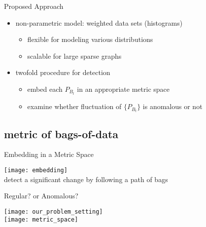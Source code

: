 \documentclass[fleqn,aspectratio=1610]{beamer}
\begin{document}
\begin{frame}[label={sec:org79ae804}]{Proposed Approach}
\begin{itemize}
\item non-parametric model: \alert{weighted data sets (histograms)}
\begin{itemize}
\item flexible for modeling various distributions
\item scalable for large sparse graphs
\end{itemize}
\end{itemize}
\bigskip
\begin{itemize}
\item twofold procedure for detection
\begin{itemize}
\item embed each \(P_{B_t}\) in an appropriate metric space
\item examine whether fluctuation of \(\{P_{B_t}\}\)
is anomalous or not
\end{itemize}
\end{itemize}
\end{frame}

\subsection{metric of bags-of-data}
\label{sec:orgdfc40ef}
\begin{frame}[label={sec:orga7975e3}]{Embedding in a Metric Space}
\begin{center}
\texttt{[image: embedding]}\\[0pt]
detect a significant change by following a path of bags
\end{center}
\end{frame}

\begin{frame}[label={sec:org0563b1c}]{Regular? or Anomalous?}
\begin{center}
\texttt{[image: our\_problem\_setting]}
\\[10pt]
\texttt{[image: metric\_space]}
\end{center}
\end{frame}
\end{document}
